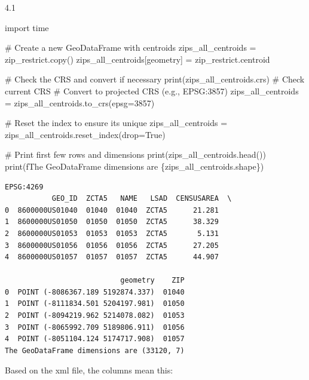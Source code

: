 \documentclass[
  letterpaper,
  DIV=11,
  numbers=noendperiod]{scrartcl}
\newenvironment{Shaded}{\begin{snugshade}}{\end{snugshade}}
\newcommand{\BuiltInTok}[1]{\textcolor[rgb]{0.00,0.23,0.31}{#1}}
\newcommand{\CommentTok}[1]{\textcolor[rgb]{0.37,0.37,0.37}{#1}}
\newcommand{\DecValTok}[1]{\textcolor[rgb]{0.68,0.00,0.00}{#1}}
\newcommand{\ImportTok}[1]{\textcolor[rgb]{0.00,0.46,0.62}{#1}}
\newcommand{\NormalTok}[1]{\textcolor[rgb]{0.00,0.23,0.31}{#1}}
\newcommand{\OperatorTok}[1]{\textcolor[rgb]{0.37,0.37,0.37}{#1}}
\newcommand{\SpecialCharTok}[1]{\textcolor[rgb]{0.37,0.37,0.37}{#1}}
\newcommand{\SpecialStringTok}[1]{\textcolor[rgb]{0.13,0.47,0.30}{#1}}
\newcommand{\StringTok}[1]{\textcolor[rgb]{0.13,0.47,0.30}{#1}}
\newcommand{\VariableTok}[1]{\textcolor[rgb]{0.07,0.07,0.07}{#1}}
\begin{document}
4.1

\begin{Shaded}
\begin{Highlighting}[]
\ImportTok{import}\NormalTok{ time}

\CommentTok{\# Create a new GeoDataFrame with centroids}
\NormalTok{zips\_all\_centroids }\OperatorTok{=}\NormalTok{ zip\_restrict.copy()}
\NormalTok{zips\_all\_centroids[}\StringTok{\textquotesingle{}geometry\textquotesingle{}}\NormalTok{] }\OperatorTok{=}\NormalTok{ zip\_restrict.centroid}

\CommentTok{\# Check the CRS and convert if necessary}
\BuiltInTok{print}\NormalTok{(zips\_all\_centroids.crs)  }\CommentTok{\# Check current CRS}
\CommentTok{\# Convert to projected CRS (e.g., EPSG:3857)}
\NormalTok{zips\_all\_centroids }\OperatorTok{=}\NormalTok{ zips\_all\_centroids.to\_crs(epsg}\OperatorTok{=}\DecValTok{3857}\NormalTok{)}

\CommentTok{\# Reset the index to ensure it\textquotesingle{}s unique}
\NormalTok{zips\_all\_centroids }\OperatorTok{=}\NormalTok{ zips\_all\_centroids.reset\_index(drop}\OperatorTok{=}\VariableTok{True}\NormalTok{)}

\CommentTok{\# Print first few rows and dimensions}
\BuiltInTok{print}\NormalTok{(zips\_all\_centroids.head())}
\BuiltInTok{print}\NormalTok{(}\SpecialStringTok{f\textquotesingle{}The GeoDataFrame dimensions are }\SpecialCharTok{\{}\NormalTok{zips\_all\_centroids}\SpecialCharTok{.}\NormalTok{shape}\SpecialCharTok{\}}\SpecialStringTok{\textquotesingle{}}\NormalTok{)}
\end{Highlighting}
\end{Shaded}

\begin{verbatim}
EPSG:4269
           GEO_ID  ZCTA5   NAME   LSAD  CENSUSAREA  \
0  8600000US01040  01040  01040  ZCTA5      21.281   
1  8600000US01050  01050  01050  ZCTA5      38.329   
2  8600000US01053  01053  01053  ZCTA5       5.131   
3  8600000US01056  01056  01056  ZCTA5      27.205   
4  8600000US01057  01057  01057  ZCTA5      44.907   

                           geometry    ZIP  
0  POINT (-8086367.189 5192874.337)  01040  
1  POINT (-8111834.501 5204197.981)  01050  
2  POINT (-8094219.962 5214078.082)  01053  
3  POINT (-8065992.709 5189806.911)  01056  
4  POINT (-8051104.124 5174717.908)  01057  
The GeoDataFrame dimensions are (33120, 7)
\end{verbatim}

Based on the xml file, the columns mean this:
\end{document}
